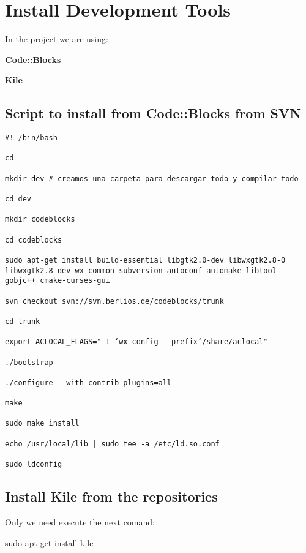 \chapter{Install Development Tools}
In the project we are using:

\hspace{2em} {\bfseries Code::Blocks}

\hspace{2em} {\bfseries  Kile}

\section{Script to install from Code::Blocks from SVN}

\begin{verbatim}
#! /bin/bash

cd

mkdir dev # creamos una carpeta para descargar todo y compilar todo

cd dev

mkdir codeblocks

cd codeblocks

sudo apt-get install build-essential libgtk2.0-dev libwxgtk2.8-0 
libwxgtk2.8-dev wx-common subversion autoconf automake libtool 
gobjc++ cmake-curses-gui

svn checkout svn://svn.berlios.de/codeblocks/trunk

cd trunk

export ACLOCAL_FLAGS="-I ‘wx-config --prefix‘/share/aclocal"

./bootstrap

./configure --with-contrib-plugins=all

make

sudo make install

echo /usr/local/lib | sudo tee -a /etc/ld.so.conf

sudo ldconfig

\end{verbatim}


\section{Install Kile from the repositories}

Only we need execute the next comand:

\hspace{2em} sudo apt-get install kile